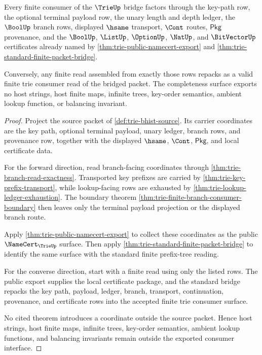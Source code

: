 \begin{theorem}\label{thm:trie-finite-consumer-completeness}
Every finite consumer of the $\TrieUp$ bridge factors through the key-path
row, the optional terminal payload row, the unary length and depth ledger, the
$\BoolUp$ branch rows, displayed $\hsame$ transport, $\Cont$ routes,
$\mathsf{Pkg}$ provenance, and the $\BoolUp$, $\ListUp$, $\OptionUp$,
$\NatUp$, and $\BitVectorUp$ certificates already named by
\autoref{thm:trie-public-namecert-export} and
\autoref{thm:trie-standard-finite-packet-bridge}.

Conversely, any finite read assembled from exactly those rows repacks as a
valid finite trie consumer read of the bridged packet. The completeness
surface exports no host strings, host finite maps, infinite trees,
key-order semantics, ambient lookup function, or balancing invariant.
\end{theorem}
\begin{proof}
Project the source packet of \autoref{def:trie-bhist-source}. Its carrier
coordinates are the key path, optional terminal payload, unary ledger, branch
rows, and provenance row, together with the displayed $\hsame$, $\Cont$,
$\mathsf{Pkg}$, and local certificate data.

For the forward direction, read branch-facing coordinates through
\autoref{thm:trie-branch-read-exactness}. Transported key prefixes are carried
by \autoref{thm:trie-key-prefix-transport}, while lookup-facing rows are
exhausted by \autoref{thm:trie-lookup-ledger-exhaustion}. The boundary theorem
\autoref{thm:trie-finite-branch-consumer-boundary} then leaves only the
terminal payload projection or the displayed branch route.

Apply \autoref{thm:trie-public-namecert-export} to collect these coordinates
as the public $\NameCert_{\TrieUp}$ surface. Then apply
\autoref{thm:trie-standard-finite-packet-bridge} to identify the same surface
with the standard finite prefix-tree reading.

For the converse direction, start with a finite read using only the listed
rows. The public export supplies the local certificate package, and the
standard bridge repacks the key path, payload, ledger, branch, transport,
continuation, provenance, and certificate rows into the accepted finite trie
consumer surface.

No cited theorem introduces a coordinate outside the source packet. Hence
host strings, host finite maps, infinite trees, key-order semantics, ambient
lookup functions, and balancing invariants remain outside the exported
consumer interface.
\end{proof}

